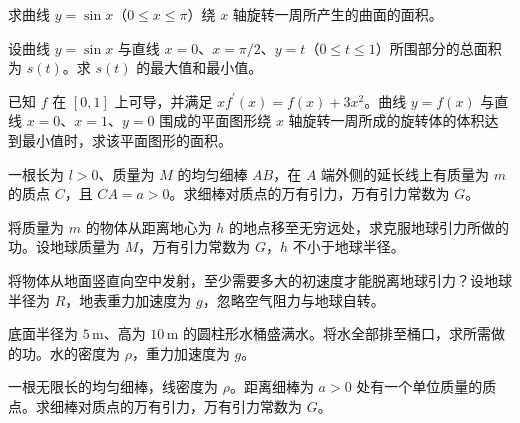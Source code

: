 \noindent\begin{minipage}{\textwidth}
求曲线 $y=\sin x$（$0\le x\le\pi$）绕 $x$ 轴旋转一周所产生的曲面的面积。
\end{minipage}\par\vfill
\noindent\begin{minipage}{\textwidth}
设曲线 $y=\sin x$ 与直线 $x=0$、$x=\pi/2$、$y=t$（$0\le t\le1$）所围部分的总面积为 $s(t)$。求 $s(t)$ 的最大值和最小值。
\end{minipage}\par\vfill
\newpage
\noindent\begin{minipage}{\textwidth}
已知 $f$ 在 $[0,1]$ 上可导，并满足 $xf^{\prime}(x)=f(x)+3x^2$。曲线 $y=f(x)$ 与直线 $x=0$、$x=1$、$y=0$ 围成的平面图形绕 $x$ 轴旋转一周所成的旋转体的体积达到最小值时，求该平面图形的面积。
\end{minipage}\par\vfill
\noindent\begin{minipage}{\textwidth}
一根长为 $l>0$、质量为 $M$ 的均匀细棒 $AB$，在 $A$ 端外侧的延长线上有质量为 $m$ 的质点 $C$，且 $CA=a>0$。求细棒对质点的万有引力，万有引力常数为 $G$。
\end{minipage}\par\vfill
\noindent\begin{minipage}{\textwidth}
将质量为 $m$ 的物体从距离地心为 $h$ 的地点移至无穷远处，求克服地球引力所做的功。设地球质量为 $M$，万有引力常数为 $G$，$h$ 不小于地球半径。
\end{minipage}\par\vfill
\newpage
\noindent\begin{minipage}{\textwidth}
将物体从地面竖直向空中发射，至少需要多大的初速度才能脱离地球引力？设地球半径为 $R$，地表重力加速度为 $g$，忽略空气阻力与地球自转。
\end{minipage}\par\vfill
\noindent\begin{minipage}{\textwidth}
底面半径为 $5\,\mathrm m$、高为 $10\,\mathrm m$ 的圆柱形水桶盛满水。将水全部排至桶口，求所需做的功。水的密度为 $\rho$，重力加速度为 $g$。
\end{minipage}\par\vfill
\noindent\begin{minipage}{\textwidth}
一根无限长的均匀细棒，线密度为 $\rho$。距离细棒为 $a>0$ 处有一个单位质量的质点。求细棒对质点的万有引力，万有引力常数为 $G$。
\end{minipage}\par\vfill
